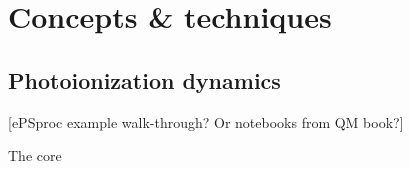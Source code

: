 \section{Concepts \& techniques}

\subsection{Photoionization dynamics} 
[ePSproc example walk-through? Or notebooks from QM book?]

The core